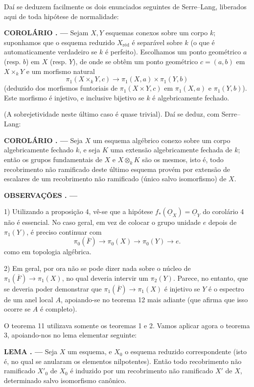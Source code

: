 \documentclass[11pt,twoside,openany]{book}
\numberwithin{equation}{section}
\newcommand{\src}[1]{%
  \phantomsection\hypertarget{src:#1}{}%
  \marginpar{\raggedleft\footnotesize\sffamily #1}%
}
\newcommand{\Osh}{\underline{O}}
\theoremstyle{plain}
\theoremstyle{definition}
\theoremstyle{remark}
\newcommand{\result}[2]{%
  \par\medskip\noindent\textbf{#1%
  \if\relax\detokenize{#2}\relax\else\space#2\fi. ---}\enspace
}
\newcommand{\FgaUnitKey}{frontmatter}
\renewcommand{\src}[1]{%
  \phantomsection\hypertarget{src:\FgaUnitKey:#1}{}%
  \marginpar{\raggedleft\footnotesize\sffamily #1}%
}
\begin{document}
Daí se deduzem facilmente os dois enunciados seguintes de Serre--Lang,
liberados aqui de toda hipótese de normalidade:

\result{COROLÁRIO}{5} Sejam $X,Y$ esquemas conexos sobre um corpo $k$;
suponhamos que o esquema reduzido $X_{\mathrm{réd}}$ é separável sobre $k$
(o que é automaticamente verdadeiro se $k$ é perfeito).
Escolhamos um ponto geométrico $a$ (resp. $b$) em $X$ (resp. $Y$), de onde se
obtêm um ponto geométrico $c=(a,b)$ em $X\times_kY$ e um morfismo natural
\[
  \pi_1(X\times_kY,c)\longrightarrow
  \pi_1(X,a)\times\pi_1(Y,b)
\]
(deduzido dos morfismos funtoriais de $\pi_1(X\times Y,c)$ em $\pi_1(X,a)$
e $\pi_1(Y,b)$). Este morfismo é injetivo, e inclusive bijetivo se $k$ é
algebricamente fechado.

(A sobrejetividade neste último caso é quase trivial). Daí se deduz,
com Serre--Lang:

\result{COROLÁRIO}{6} Seja $X$ um esquema algébrico conexo sobre um corpo
algebricamente fechado $k$, e seja $K$ uma extensão algebricamente fechada
de $k$; então os grupos fundamentais de $X$ e $X\otimes_kK$ são os
mesmos, isto é, todo recobrimento não ramificado deste último esquema
provém por extensão de escalares de um recobrimento não ramificado (único
salvo isomorfismo) de $X$.

\result{OBSERVAÇÕES}{}

1) Utilizando a proposição 4, vê-se que a hipótese
$f_*(\Osh_X)=\Osh_Y$ do corolário 4 não é essencial. No caso geral, em vez
de colocar o grupo unidade $e$ depois de $\pi_1(Y)$, é preciso continuar com
\[
  \pi_0(\overline F)\longrightarrow\pi_0(X)
  \longrightarrow\pi_0(Y)\longrightarrow e.
\]
como em topologia algébrica.

\src{216}
2) Em geral, por ora não se pode dizer nada sobre o núcleo de
$\pi_1(\overline F)\longrightarrow\pi_1(X)$, no qual deveria intervir um
$\pi_2(Y)$. Parece, no entanto, que se deveria poder demonstrar que
$\pi_1(\overline F)\longrightarrow\pi_1(X)$ é injetivo se $Y$ é o espectro
de um anel local $A$, apoiando-se no teorema 12 mais adiante (que afirma que
isso ocorre se $A$ é completo).

O teorema 11 utilizava somente os teoremas 1 e 2. Vamos aplicar agora o
teorema 3, apoiando-nos no lema elementar seguinte:

\result{LEMA}{6} Seja $X$ um esquema, e $X_0$ o esquema reduzido correspondente
(isto é, no qual se anularam os elementos nilpotentes). Então todo
recobrimento não ramificado $X'_0$ de $X_0$ é induzido por um recobrimento
não ramificado $X'$ de $X$, determinado salvo isomorfismo canônico.
\end{document}
